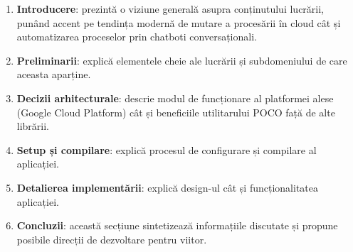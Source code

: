 \begin{enumerate}
    \item \textbf{Introducere}: prezintă o viziune generală asupra conținutului lucrării, punând accent pe tendința modernă de mutare a procesării în cloud cât și automatizarea proceselor prin chatboti conversaționali.
    \item \textbf{Preliminarii}: explică elementele cheie ale lucrării și subdomeniului de care aceasta aparține.
    \item \textbf{Decizii arhitecturale}: descrie modul de funcționare al platformei alese (Google Cloud Platform) cât și beneficiile utilitarului POCO față de alte librării.
    \item \textbf{Setup și compilare}: explică procesul de configurare și compilare al aplicației.
    \item \textbf{Detalierea implementării}: explică design-ul cât și funcționalitatea aplicației.
    \item \textbf{Concluzii}: această secțiune sintetizează informațiile discutate și propune posibile direcții de dezvoltare pentru viitor.
\end{enumerate}